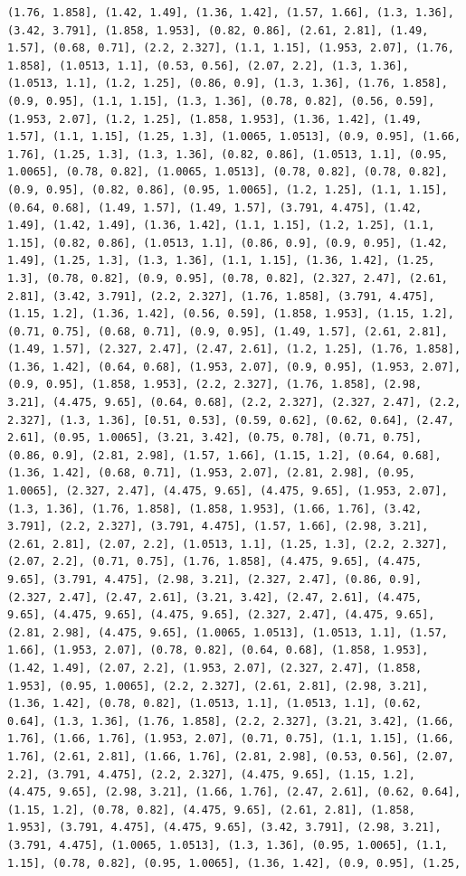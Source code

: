 \documentclass[12pt,fleqn]{article}\usepackage{../common}
\begin{document}
\begin{verbatim}
(1.76, 1.858], (1.42, 1.49], (1.36, 1.42], (1.57, 1.66], (1.3, 1.36], (3.42, 3.791], (1.858, 1.953], (0.82, 0.86], (2.61, 2.81], (1.49, 1.57], (0.68, 0.71], (2.2, 2.327], (1.1, 1.15], (1.953, 2.07], (1.76, 1.858], (1.0513, 1.1], (0.53, 0.56], (2.07, 2.2], (1.3, 1.36], (1.0513, 1.1], (1.2, 1.25], (0.86, 0.9], (1.3, 1.36], (1.76, 1.858], (0.9, 0.95], (1.1, 1.15], (1.3, 1.36], (0.78, 0.82], (0.56, 0.59], (1.953, 2.07], (1.2, 1.25], (1.858, 1.953], (1.36, 1.42], (1.49, 1.57], (1.1, 1.15], (1.25, 1.3], (1.0065, 1.0513], (0.9, 0.95], (1.66, 1.76], (1.25, 1.3], (1.3, 1.36], (0.82, 0.86], (1.0513, 1.1], (0.95, 1.0065], (0.78, 0.82], (1.0065, 1.0513], (0.78, 0.82], (0.78, 0.82], (0.9, 0.95], (0.82, 0.86], (0.95, 1.0065], (1.2, 1.25], (1.1, 1.15], (0.64, 0.68], (1.49, 1.57], (1.49, 1.57], (3.791, 4.475], (1.42, 1.49], (1.42, 1.49], (1.36, 1.42], (1.1, 1.15], (1.2, 1.25], (1.1, 1.15], (0.82, 0.86], (1.0513, 1.1], (0.86, 0.9], (0.9, 0.95], (1.42, 1.49], (1.25, 1.3], (1.3, 1.36], (1.1, 1.15], (1.36, 1.42], (1.25, 1.3], (0.78, 0.82], (0.9, 0.95], (0.78, 0.82], (2.327, 2.47], (2.61, 2.81], (3.42, 3.791], (2.2, 2.327], (1.76, 1.858], (3.791, 4.475], (1.15, 1.2], (1.36, 1.42], (0.56, 0.59], (1.858, 1.953], (1.15, 1.2], (0.71, 0.75], (0.68, 0.71], (0.9, 0.95], (1.49, 1.57], (2.61, 2.81], (1.49, 1.57], (2.327, 2.47], (2.47, 2.61], (1.2, 1.25], (1.76, 1.858], (1.36, 1.42], (0.64, 0.68], (1.953, 2.07], (0.9, 0.95], (1.953, 2.07], (0.9, 0.95], (1.858, 1.953], (2.2, 2.327], (1.76, 1.858], (2.98, 3.21], (4.475, 9.65], (0.64, 0.68], (2.2, 2.327], (2.327, 2.47], (2.2, 2.327], (1.3, 1.36], [0.51, 0.53], (0.59, 0.62], (0.62, 0.64], (2.47, 2.61], (0.95, 1.0065], (3.21, 3.42], (0.75, 0.78], (0.71, 0.75], (0.86, 0.9], (2.81, 2.98], (1.57, 1.66], (1.15, 1.2], (0.64, 0.68], (1.36, 1.42], (0.68, 0.71], (1.953, 2.07], (2.81, 2.98], (0.95, 1.0065], (2.327, 2.47], (4.475, 9.65], (4.475, 9.65], (1.953, 2.07], (1.3, 1.36], (1.76, 1.858], (1.858, 1.953], (1.66, 1.76], (3.42, 3.791], (2.2, 2.327], (3.791, 4.475], (1.57, 1.66], (2.98, 3.21], (2.61, 2.81], (2.07, 2.2], (1.0513, 1.1], (1.25, 1.3], (2.2, 2.327], (2.07, 2.2], (0.71, 0.75], (1.76, 1.858], (4.475, 9.65], (4.475, 9.65], (3.791, 4.475], (2.98, 3.21], (2.327, 2.47], (0.86, 0.9], (2.327, 2.47], (2.47, 2.61], (3.21, 3.42], (2.47, 2.61], (4.475, 9.65], (4.475, 9.65], (4.475, 9.65], (2.327, 2.47], (4.475, 9.65], (2.81, 2.98], (4.475, 9.65], (1.0065, 1.0513], (1.0513, 1.1], (1.57, 1.66], (1.953, 2.07], (0.78, 0.82], (0.64, 0.68], (1.858, 1.953], (1.42, 1.49], (2.07, 2.2], (1.953, 2.07], (2.327, 2.47], (1.858, 1.953], (0.95, 1.0065], (2.2, 2.327], (2.61, 2.81], (2.98, 3.21], (1.36, 1.42], (0.78, 0.82], (1.0513, 1.1], (1.0513, 1.1], (0.62, 0.64], (1.3, 1.36], (1.76, 1.858], (2.2, 2.327], (3.21, 3.42], (1.66, 1.76], (1.66, 1.76], (1.953, 2.07], (0.71, 0.75], (1.1, 1.15], (1.66, 1.76], (2.61, 2.81], (1.66, 1.76], (2.81, 2.98], (0.53, 0.56], (2.07, 2.2], (3.791, 4.475], (2.2, 2.327], (4.475, 9.65], (1.15, 1.2], (4.475, 9.65], (2.98, 3.21], (1.66, 1.76], (2.47, 2.61], (0.62, 0.64], (1.15, 1.2], (0.78, 0.82], (4.475, 9.65], (2.61, 2.81], (1.858, 1.953], (3.791, 4.475], (4.475, 9.65], (3.42, 3.791], (2.98, 3.21], (3.791, 4.475], (1.0065, 1.0513], (1.3, 1.36], (0.95, 1.0065], (1.1, 1.15], (0.78, 0.82], (0.95, 1.0065], (1.36, 1.42], (0.9, 0.95], (1.25, 
\end{verbatim}
\end{document}
